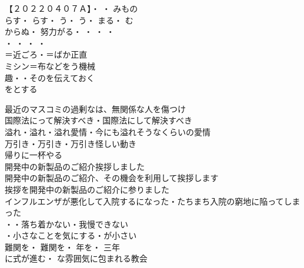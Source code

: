 
\begin{multicols}{2}
【２０２２０４０７Ａ】・
・
みもの\\
らす・
らす・
う・
う・
まる・
む\\
からぬ・
努力がる・
・
・
・
\\
・
・
・
・
\\

＝近ごろ・＝ばか正直\\
ミシン＝布などをう機械\\
趣・・そのを伝えておく\\
をとする\\

\end{multicols}

最近のマスコミの過剰なは、無関係な人を傷つけ\\
国際法にって解決すべき・国際法にして解決すべき\\

溢れ・溢れ・溢れ愛情・今にも溢れそうなくらいの愛情\\
万引き・万引き・万引き怪しい動き\\

帰りに一杯やる\\
開発中の新製品のご紹介挨拶しました\\
開発中の新製品のご紹介、その機会を利用して挨拶します\\
挨拶を開発中の新製品のご紹介に参りました\\
インフルエンザが悪化して入院するになった・たちまち入院の窮地に陥ってしまった\\

・・落ち着かない・我慢できない\\
・小さなことを気にする・が小さい\\
難関を・
難関を・
年を・
三年\\
に式が進む・
な雰囲気に包まれる教会\\


